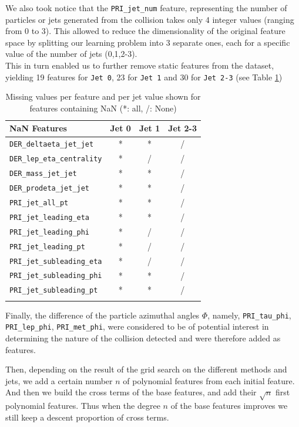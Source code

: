 \documentclass[10pt,conference,compsocconf]{IEEEtran}
\begin{document}
We also took notice that the \verb+PRI_jet_num+ feature, representing the number of particles or jets generated from the collision takes only 4 integer values (ranging from 0 to 3). This allowed to reduce the dimensionality of the original feature space by splitting our learning problem into 3 separate ones, each for a specific value of the number of jets (0,1,2-3).\\
This in turn enabled us to further remove static features from the dataset, yielding 19 features for  \verb+Jet 0+, 23 for \verb+Jet 1+ and 30 for \verb+Jet 2-3+ (see Table \ref{tab_feats})
\begin{table}[h!]
\centering
\caption{Missing values per feature and per jet value shown for features containing NaN (*: all, /: None)}
\footnotesize
\hspace{-0.2cm}
\begin{tabular}{ l| ccc } 
 \hline
   NaN Features & Jet 0 & Jet 1 & Jet 2-3 \\
 \hline
   \verb+DER_deltaeta_jet_jet+  & * & * & /  \\
   \verb+DER_lep_eta_centrality+  & * & / & / \\
   \verb+DER_mass_jet_jet+  & * & * & / \\
   \verb+DER_prodeta_jet_jet+  & * & * & /  \\ 
   \verb+PRI_jet_all_pt+  & * & * & /  \\
   \verb+PRI_jet_leading_eta+  & * & * & / \\
   \verb+PRI_jet_leading_phi+  & * & / & /   \\
   \verb+PRI_jet_leading_pt+  & * & / & / \\
   \verb+PRI_jet_subleading_eta+  & * & / & / \\
   \verb+PRI_jet_subleading_phi+  & * & * & /  \\
   \verb+PRI_jet_subleading_pt+  & * & * & /  \\
  \hline
\label{tab_feats}
\end{tabular}
\end{table}

Finally, the difference of the particle azimuthal angles $\Phi$, namely, \verb+PRI_tau_phi+, \verb+PRI_lep_phi+, \verb+PRI_met_phi+, were considered to be of potential interest  in determining the nature of the collision detected and were therefore added as features.

Then, depending on the result of the grid search on the different methods and jets, we add a certain number $n$ of polynomial features from each initial feature. And then we build the cross terms of the base features, and add their $\sqrt{n}$ first polynomial features. Thus when the degree $n$ of the base features improves we still keep a descent proportion of cross terms.
\end{document}
